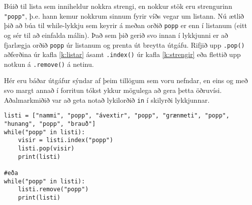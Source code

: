 \begin{exercise}\label{lyk8}
Búið til lista sem inniheldur nokkra strengi, en nokkur stök eru strengurinn \texttt{"popp"}, þ.e. hann kemur nokkrum sinnum fyrir víðs vegar um listann.
Nú ætlið þið að búa til while-lykkju sem keyrir á meðan orðið \texttt{popp} er enn í listanum (eitt og sér til að einfalda málin).
Það sem þið gerið svo innan í lykkjunni er að fjarlægja orðið \texttt{popp} úr listanum og prenta út breytta útgáfu.
Rifjið upp \texttt{.pop()} aðferðina úr kafla \ref{k:listar} ásamt \texttt{.index()} úr kafla \ref{k:strengir} eða flettið upp notkun á \texttt{.remove()} á netinu.
\end{exercise}
\begin{Answer}[ref={lyk8}]
Hér eru báðar útgáfur sýndar af þeim tillögum sem voru nefndar, en eins og með svo margt annað í forritun tókst ykkur mögulega að gera þetta öðruvísi.
Aðalmarkmiðið var að geta notað lykilorðið \texttt{in} í skilyrði lykkjunnar.
	\begin{lstlisting}
listi = ["nammi", "popp", "ávextir", "popp", "grænmeti", "popp", "hunang", "popp", "brauð"]
while("popp" in listi):
	visir = listi.index("popp")
	listi.pop(visir)
	print(listi)
		
#eða
while("popp" in listi):
	listi.remove("popp")
	print(listi)\end{lstlisting}
\end{Answer}